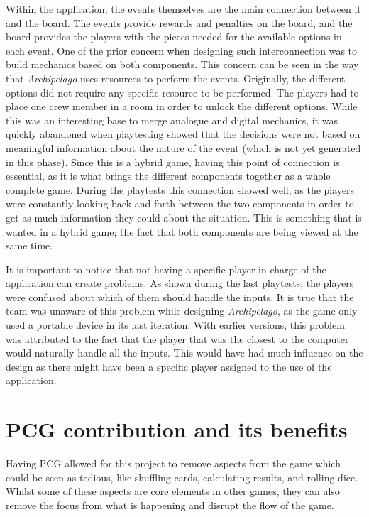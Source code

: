 Within the application, the events themselves are the main connection between it and the board. The events provide rewards and penalties on the board, and the board provides the players with the pieces needed for the available options in each event. One of the prior concern when designing such interconnection was to build mechanics based on both components. This concern can be seen in the way that \textit{Archipelago} uses resources to perform the events. Originally, the different options did not require any specific resource to be performed. The players had to place one crew member in a room in order to unlock the different options. While this was an interesting base to merge analogue and digital mechanics, it was quickly abandoned when playtesting showed that the decisions were not based on meaningful information about the nature of the event (which is not yet generated in this phase). 
Since this is a hybrid game, having this point of connection is essential, as it is what brings the different components together as a whole complete game. During the playtests this connection showed well, as the players were constantly looking back and forth between the two components in order to get as much information they could about the situation. This is something that is wanted in a hybrid game; the fact that both components are being viewed at the same time. 


It is important to notice that not having a specific player in charge of the application can create problems. As shown during the last playtests, the players were confused about which of them should handle the inputs. It is true that the team was unaware of this problem while designing \textit{Archipelago}, as the game only used a portable device in its last iteration. With earlier versions, this problem was attributed to the fact that the player that was the closest to the computer would naturally handle all the inputs. This would have had much influence on the design as there might have been a specific player assigned to the use of the application. 

\section{PCG contribution and its benefits}
\label{sec:pcgben}
Having PCG allowed for this project to remove aspects from the game which could be seen as tedious, like shuffling cards, calculating results, and rolling dice. Whilst some of these aspects are core elements in other games, they can also remove the focus from what is happening and disrupt the flow of the game.

